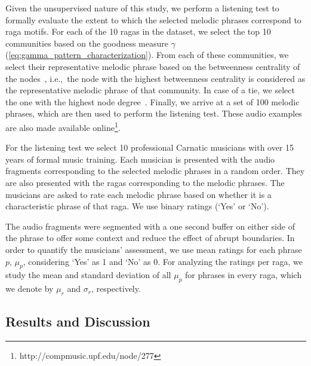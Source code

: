 Given the unsupervised nature of this study, we perform a listening test to formally evaluate the extent to which the selected melodic phrases correspond to \gls{raga} motifs. For each of the 10 \glspl{raga} in the dataset, we select the top 10 communities based on the goodness measure $\gamma$ (\eqref{eq:gamma_pattern_characterization}). From each of these communities, we select their representative melodic phrase based on the betweenness centrality of the nodes~\citep{newman2003structure}, i.e.,~the node with the highest betweenness centrality is considered as the representative melodic phrase of that community. In case of a tie, we select the one with the highest node degree~\citep{newman2003structure}. Finally, we  arrive at a set of 100 melodic phrases, which are then used to perform the listening test. These audio examples are also made available online\footnote{http://compmusic.upf.edu/node/277}. 

For the listening test we select 10 professional Carnatic musicians with over 15 years of formal music training. Each musician is presented with the audio fragments corresponding to the selected melodic phrases in a random order. They are also presented with the \glspl{raga} corresponding to the melodic phrases. The musicians are asked to rate each melodic phrase based on whether it is a characteristic phrase of that \gls{raga}. We use binary ratings (`Yes' or `No'). 

The audio fragments were segmented with a one second buffer on either side of the phrase to offer some context and reduce the effect of abrupt boundaries. %
In order to quantify the musicians' assessment, we use mean ratings for each phrase $p$, $\mu_p$, considering `Yes' as 1 and `No' as 0. For analyzing the ratings per \gls{raga}, we study the mean and standard deviation of all $\mu_p$ for phrases in every \gls{raga}, which we denote by $\mu_r$ and $\sigma_r$, respectively.


\subsection{Results and Discussion}
\label{sec:patterns_characterization_results_and_discussion}

